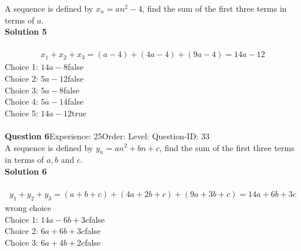\documentclass{article}
\begin{document}
A sequence is defined by $x_n=an^2-4$, find the sum of the first three terms in terms of $a$.\\[4pt]
\noindent\textbf{Solution 5}\\[2pt]
\\[-35pt]\begin{align*}
x_1+x_2+x_3=(a-4)+(4a-4)+(9a-4)=14a-12
\end{align*}
Choice 1: \hspace{20pt}$14a-8$\hspace{20pt}false\\
Choice 2: \hspace{20pt}$5a-12$\hspace{20pt}false\\
Choice 3: \hspace{20pt}$5a-8$\hspace{20pt}false\\
Choice 4: \hspace{20pt}$5a-14$\hspace{20pt}false\\
Choice 5: \hspace{20pt}$14a-12$\hspace{20pt}true\\
\\[4pt]
\noindent\textbf{Question 6}\hspace{20pt}Experience: 25\hspace{20pt}Order: \hspace{20pt}Level: \hspace{20pt}Question-ID: 33\\[2pt]
A sequence is defined by $y_n=an^2+bn+c$, find the sum of the first three terms in terms of $a,b$ and $c$.\\[4pt]
\noindent\textbf{Solution 6}\\[2pt]
\\[-35pt]\begin{align*}
y_1+y_2+y_3=(a+b+c)+(4a+2b+c)+(9a+3b+c)=14a+6b+3c
\end{align*}
wrong choice\\[4pt]
Choice 1: \hspace{20pt}$14a-6b+3c$\hspace{20pt}false\\
Choice 2: \hspace{20pt}$6a+6b+3c$\hspace{20pt}false\\
Choice 3: \hspace{20pt}$6a+4b+2c$\hspace{20pt}false\\
\end{document}
